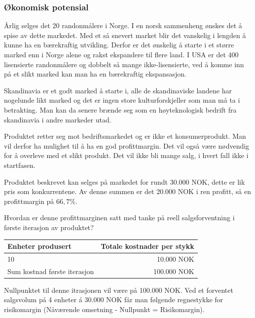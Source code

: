 \subsubsection{Økonomisk potensial}

Årlig selges det 20 randonmålere i Norge. I en norsk sammenheng ønskes det å spise av dette markedet. Med et så snevert market blir det vanskelig i lengden å kunne ha en bærekraftig utvikling. Derfor er det ønskelig å starte i et større marked enn i Norge alene og rakst ekspandere til flere land. I USA er det 400 lisensierte randonmålere og dobbelt så mange ikke-lisensierte, ved å komme inn på et slikt marked kan man ha en bærekraftig ekspansasjon.

Skandinavia er et godt marked å starte i, alle de skandinaviske landene har nogelunde likt marked og det er ingen store kulturforskjeller som man må ta i betrakting. Man kan da senere brænde seg som en høyteknologisk bedrift fra skandinavia i andre markeder utad.

Produktet retter seg mot bedriftsmarkedet og er ikke et konsumerprodukt. Man vil derfor ha mulighet til å ha en god profittmargin. Det vil også være nødvendig for å overleve med et slikt produkt. Det vil ikke bli mange salg, i hvert fall ikke i startfasen.

Produktet beskrevet kan selges på markedet for rundt 30.000 NOK, dette er lik pris som konkurrentene. Av denne summen er det 20.000 NOK i ren profitt, så en profittmargin på $66,7 \%$.

Hvordan er denne profittmarginen satt med tanke på reell salgsforventning i første iterasjon av produktet?

\begin{table}[ht!]
    \begin{center}
    \begin{tabular}{ | l | r | }
        \hline
        Enheter produsert               & Totale kostnader per stykk \\
        \hline
        10                              & 10.000 NOK \\
        \hline
        Sum kostnad første iterasjon    & 100.000 NOK \\
        \hline
    \end{tabular}
    \end{center}
\end{table}

Nullpunktet til denne itrasjonen vil være på 100.000 NOK. Ved et forventet salgsvolum på 4 enheter á 30.000 NOK får man følgende regnestykke for risikomargin (Nåværende omsetning - Nullpunkt = Risikomargin).

